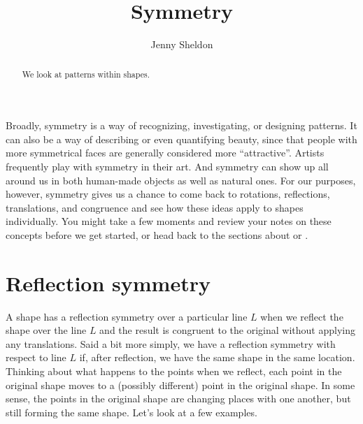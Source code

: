 \documentclass{ximera}
\title{Symmetry}
\author{Jenny Sheldon}
\begin{document}
\begin{abstract}
We look at patterns within shapes.
\end{abstract}
\maketitle

Broadly, symmetry is a way of recognizing, investigating, or designing patterns. It can also be a way of describing or even quantifying beauty, since  that people with more symmetrical faces are generally considered more ``attractive''. Artists frequently play with symmetry in their art. And symmetry can show up all around us in both human-made objects as well as natural ones. For our purposes, however, symmetry gives us a chance to come back to rotations, reflections, translations, and congruence and see how these ideas apply to shapes individually. You might take a few moments and review your notes on these concepts before we get started, or head back to the sections about  or .

\section{Reflection symmetry}

A shape has a reflection symmetry over a particular line $L$ when we reflect the shape over the line $L$ and the result is congruent to the original without applying any translations. Said a bit more simply, we have a reflection symmetry with respect to line $L$ if, after reflection, we have the same shape in the same location. Thinking about what happens to the points when we reflect, each point in the original shape moves to a (possibly different) point in the original shape. In some sense, the points in the original shape are changing places with one another, but still forming the same shape. Let's look at a few examples.
\end{document}
